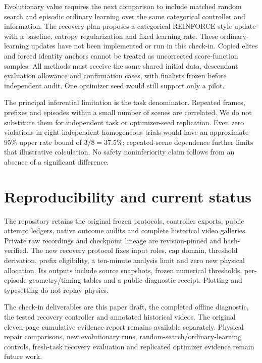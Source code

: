 \documentclass[sigconf,dvipsnames]{acmart}
\begin{document}
Evolutionary value requires the next comparison to include matched random search
and episodic ordinary learning over the same categorical controller and information.
The recovery plan proposes a categorical REINFORCE-style update with a baseline,
entropy regularization and fixed learning rate. These ordinary-learning updates
have not been implemented or run in this check-in. Copied elites and forced
identity anchors cannot be treated as uncorrected score-function samples.
All methods must receive the same shared initial data, descendant evaluation
allowance and confirmation cases, with finalists frozen before independent audit.
One optimizer seed would still support only a pilot.

The principal inferential limitation is the task denominator. Repeated frames,
prefixes and episodes within a small number of scenes are correlated. We do not
substitute them for independent task or optimizer-seed replication. Even zero
violations in eight independent homogeneous trials would have an approximate
95\% upper rate bound of $3/8=37.5\%$; repeated-scene dependence further limits
that illustrative calculation. No safety noninferiority claim follows from an
absence of a significant difference.

\section{Reproducibility and current status}
The repository retains the original frozen protocols, controller exports, public
attempt ledgers, native outcome audits and complete historical video galleries.
Private raw recordings and checkpoint lineage are revision-pinned and hash-verified.
The new recovery protocol fixes input roles, cap domain, threshold derivation,
prefix eligibility, a ten-minute analysis limit and zero new physical allocation.
Its outputs include source snapshots, frozen numerical thresholds, per-episode
geometry/timing tables and a public diagnostic receipt. Plotting and typesetting
do not replay physics.

The check-in deliverables are this paper draft, the completed offline diagnostic,
the tested recovery controller and annotated historical videos. The original
eleven-page cumulative evidence report remains available separately. Physical
repair comparisons, new evolutionary runs, random-search/ordinary-learning controls,
fresh-task recovery evaluation and replicated optimizer evidence remain future work.
\end{document}
